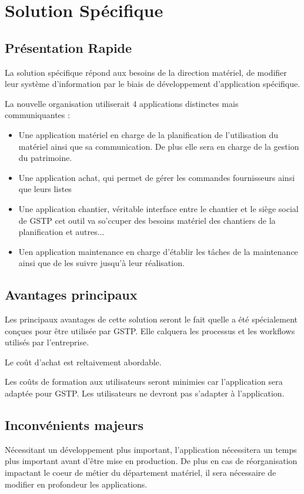 \section{Solution Spécifique}

\subsection{Présentation Rapide}

La solution spécifique répond aux besoins de la direction matériel, de modifier
leur système d'information par le biais de développement d'application spécifique.

La nouvelle organisation utiliserait 4 applications distinctes mais communiquantes : 
\begin{itemize}
\item Une application matériel en charge de la planification de l'utilisation du 
matériel ainsi que sa communication. De plus elle sera en charge de la gestion du 
patrimoine.
\item Une application achat, qui permet de gérer les commandes fournisseurs ainsi que
leurs listes
\item Une application chantier, véritable interface entre le chantier et le siège 
social de GSTP cet outil va so'ccuper des besoins matériel des chantiers de la planification et autres...
\item Uen application maintenance en charge d'établir les tâches de la maintenance ainsi que de les suivre 
jusqu'à leur réalisation.
\end{itemize}

\subsection{Avantages principaux}

Les principaux avantages de cette solution seront le fait quelle a été spécialement
conçues pour être utilisée par GSTP. Elle calquera les processus et les workflows
utilisés par l'entreprise.

Le coût d'achat est reltaivement abordable.

Les coûts de formation aux utilisateurs seront minimies car l'application sera 
adaptée pour GSTP. Les utilisateurs ne devront pas s'adapter à l'application.

\subsection{Inconvénients majeurs}

Nécessitant un développement plus important, l'application nécessitera un temps
plus important avant d'être mise en production. De plus en cas de réorganisation
impactant le coeur de métier du département matériel, il sera nécessaire de modifier
en profondeur les applications. 

